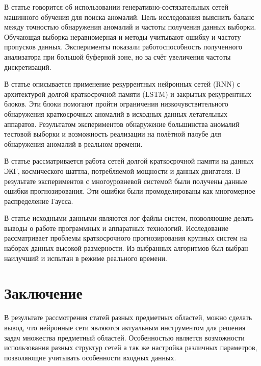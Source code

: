 \documentclass[12pt,a4paper]{article}
\begin{document}
В статье \cite{art7} говорится об использовании генеративно-состязательных сетей машинного обучения для поиска аномалий. Цель исследования выяснить баланс между точностью обнаружения аномалий и частоты получения данных выборки. Обучающая выборка неравномерная и методы учитывают ошибку и частоту пропусков данных. Эксперименты показали работоспособность полученного анализатора при большой буферной зоне, но за счёт увеличения частоты дискретизаций.

В статье \cite{art8} описывается применение рекуррентных нейронных сетей (RNN) с архитектурой долгой краткосрочной памяти (LSTM) и закрытых рекуррентных блоков. Эти блоки помогают пройти ограничения низкочувствительного обнаружения краткосрочных аномалий в исходных данных летательных аппаратов. Результатом экспериментов обнаружение большинства аномалий тестовой выборки и возможность реализации на полётной палубе для обнаружения аномалий в реальном времени.

В статье \cite{art9} рассматривается работа сетей долгой краткосрочной памяти на данных ЭКГ, космического шаттла, потребляемой мощности и данных двигателя. В результате экспериментов с многоуровневой системой были получены данные ошибки прогнозирования. Эти ошибки были промоделированы как многомерное распределение Гаусса.

В статье \cite{art10} исходными данными являются лог файлы систем, позволяющие делать выводы о работе программных и аппаратных технологий. Исследование рассматривает проблемы краткосрочного прогнозирования крупных систем на наборах данных высокой размерности. Из выбранных алгоритмов был выбран наилучший и испытан в режиме реального времени.
\section*{Заключение}

В результате рассмотрения статей разных предметных областей, можно сделать вывод, что нейронные сети являются актуальным инструментом для решения задач множества предметный областей. Особенностью является возможности использования разных структур сетей а так же настройка различных параметров, позволяющие учитывать особенности входных данных. 
\end{document}
